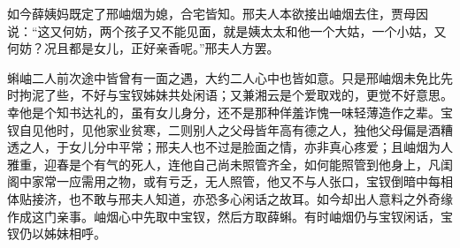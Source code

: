 \begin{parag}
    如今薛姨妈既定了邢岫烟为媳，合宅皆知。邢夫人本欲接出岫烟去住，贾母因说：“这又何妨，两个孩子又不能见面，就是姨太太和他一个大姑，一个小姑，又何妨？况且都是女儿，正好亲香呢。”邢夫人方罢。
\end{parag}


\begin{parag}
    蝌岫二人前次途中皆曾有一面之遇，大约二人心中也皆如意。只是邢岫烟未免比先时拘泥了些，不好与宝钗姊妹共处闲语；又兼湘云是个爱取戏的，更觉不好意思。幸他是个知书达礼的，虽有女儿身分，还不是那种佯羞诈愧一味轻薄造作之辈。宝钗自见他时，见他家业贫寒，二则别人之父母皆年高有德之人，独他父母偏是酒糟透之人，于女儿分中平常；邢夫人也不过是脸面之情，亦非真心疼爱；且岫烟为人雅重，迎春是个有气的死人，连他自己尚未照管齐全，如何能照管到他身上，凡闺阁中家常一应需用之物，或有亏乏，无人照管，他又不与人张口，宝钗倒暗中每相体贴接济，也不敢与邢夫人知道，亦恐多心闲话之故耳。如今却出人意料之外奇缘作成这门亲事。岫烟心中先取中宝钗，然后方取薛蝌。有时岫烟仍与宝钗闲话，宝钗仍以姊妹相呼。
\end{parag}


